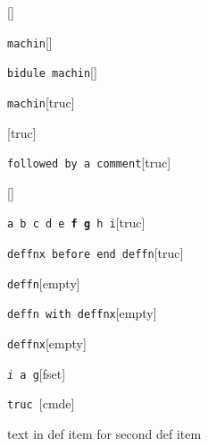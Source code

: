 \documentclass{book}
\begin{document}
\begin{titlepage}
%
\noindent\texttt\bgroup{}\egroup{}\hfill[]



\noindent\texttt\bgroup{}machin\egroup{}\hfill[]



%
\noindent\texttt\bgroup{}bidule machin\egroup{}\hfill[]



%
\noindent\texttt\bgroup{}machin\egroup{}\hfill[truc]



%
\noindent\texttt\bgroup{}\egroup{}\hfill[truc]



\noindent\texttt\bgroup{}followed by a comment\egroup{}\hfill[truc]



%
\noindent\texttt\bgroup{}\egroup{}\hfill[]



\noindent\texttt\bgroup{}a b c d e \textbf{f g} h i\egroup{}\hfill[truc]



%
\noindent\texttt\bgroup{}deffnx before end deffn\egroup{}\hfill[truc]



%


\noindent\texttt\bgroup{}deffn\egroup{}\hfill[empty]



%

\noindent\texttt\bgroup{}deffn with deffnx\egroup{}\hfill[empty]



%
\noindent\texttt\bgroup{}deffnx\egroup{}\hfill[empty]



%

\noindent\texttt\bgroup{}\emph{i} a g\egroup{}\hfill[fset]



%
\noindent\texttt\bgroup{}truc \egroup{}\hfill[cmde]



%
text in def item for second def item



\end{titlepage}
\end{document}

